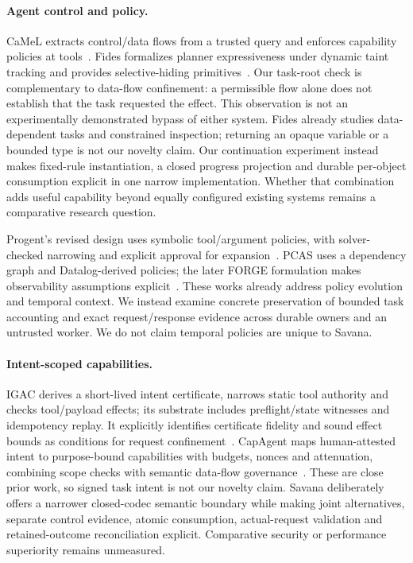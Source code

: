 \documentclass[letterpaper,twocolumn,10pt]{article}
\newcommand{\sys}{Savana}
\begin{document}
\paragraph{Agent control and policy.}
CaMeL extracts control/data flows from a trusted query and enforces capability
policies at tools~\cite{debenedetti2025camel}. Fides formalizes planner
expressiveness under dynamic taint tracking and provides selective-hiding
primitives~\cite{costa2025fides}. Our task-root check is complementary to data-flow
confinement: a permissible flow alone does not establish that the task requested
the effect. This observation is not an experimentally demonstrated bypass of
either system.
Fides already studies data-dependent tasks and constrained inspection; returning
an opaque variable or a bounded type is not our novelty claim. Our continuation
experiment instead makes fixed-rule instantiation, a closed progress projection
and durable per-object consumption explicit in one narrow implementation.
Whether that combination adds useful capability beyond equally configured
existing systems remains a comparative research question.

Progent's revised design uses symbolic tool/argument policies, with solver-checked
narrowing and explicit approval for expansion~\cite{shi2025progent}.
PCAS uses a dependency graph and Datalog-derived policies; the later FORGE
formulation makes observability assumptions explicit~\cite{palumbo2026pcas,
palumbo2026forge}. These works already address policy evolution and temporal
context. We instead examine concrete preservation of bounded task accounting
and exact request/response evidence across durable owners and an untrusted worker.
We do not claim temporal policies are unique to \sys{}.

\paragraph{Intent-scoped capabilities.}
IGAC derives a short-lived intent certificate, narrows static tool authority and
checks tool/payload effects; its substrate includes preflight/state witnesses
and idempotency replay. It explicitly identifies certificate fidelity and
sound effect bounds as conditions for request confinement~\cite{zhu2026igac}.
CapAgent maps human-attested intent to purpose-bound capabilities with budgets,
nonces and attenuation, combining scope checks with semantic data-flow
governance~\cite{hou2026capagent}.
These are close prior work, so signed task intent is not our novelty claim.
\sys{} deliberately offers a narrower closed-codec semantic boundary while
making joint alternatives, separate control evidence, atomic consumption,
actual-request validation and retained-outcome reconciliation explicit.
Comparative security or performance superiority remains unmeasured.
\end{document}
